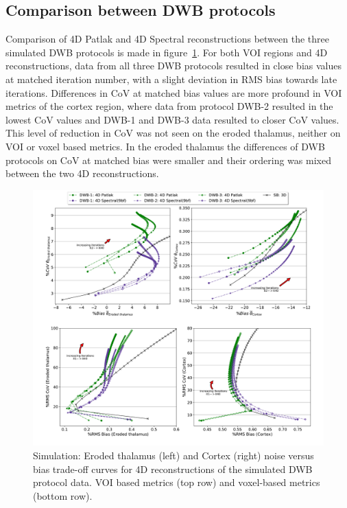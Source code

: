\subsection{Comparison between DWB protocols}
Comparison of 4D Patlak and 4D Spectral reconstructions between the three simulated DWB protocols is made in figure~\ref{fig:3_4_ComparingDWBProtocols}. For both VOI regions and 4D reconstructions, data from all three DWB protocols resulted in close bias values at matched iteration number, with a slight deviation in RMS bias towards late iterations.
Differences in CoV at matched bias values are more profound in VOI metrics of the cortex region, where data from protocol DWB-2 resulted in the lowest CoV values and DWB-1 and DWB-3 data resulted to closer CoV values. This level of reduction in CoV was not seen on the eroded thalamus, neither on VOI or voxel based metrics. In the eroded thalamus the differences of DWB protocols on CoV at matched  bias were smaller and their ordering was mixed between the two 4D reconstructions. 

\begin{figure} [ht!]
\centering
\includegraphics[scale=0.42,angle=0]{3_Results/3_2_Dynamic_Reconstruction_SimulationStudy/figures/VOI/3_4.pdf}
\caption{Simulation: Eroded thalamus (left) and Cortex (right) noise versus bias trade-off curves for 4D reconstructions of the simulated DWB protocol data. VOI based metrics (top row) and voxel-based metrics (bottom row).} 
\label{fig:3_4_ComparingDWBProtocols}
\end{figure} 

